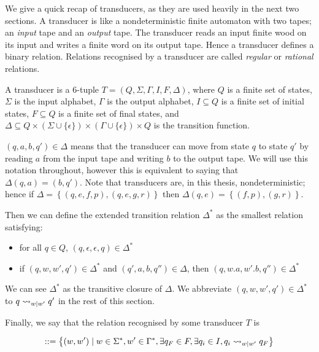 \documentclass[10pt, a4paper]{report}
\begin{document}
We give a quick recap of transducers, as they are used heavily in the next two
sections. A transducer is like a nondeterministic finite automaton with two
tapes; an \emph{input} tape and an \emph{output} tape. The transducer reads
an input finite wood on its input and writes a finite word on its output tape.
Hence a transducer defines a binary relation. Relations recognised by a
transducer are called \emph{regular} or \emph{rational} relations. 

A transducer is a 6-tuple $T = (Q, \Sigma, \Gamma, I, F, \Delta)$, where $Q$ is
a finite set of states, $\Sigma$ is the input alphabet, $\Gamma$ is the output
alphabet, $I \subseteq Q$ is a finite set of initial states, $F \subseteq Q$ is
a finite set of final states, and $\Delta \subseteq Q \times \left( \Sigma \cup
  \{\epsilon\} \right) \times \left( \Gamma \cup \{\epsilon\} \right) \times Q$
is the transition function.

$(q, a, b, q') \in \Delta$ means that the transducer can move from state $q$ to
state $q'$ by reading $a$ from the input tape and writing $b$ to the output
tape. We will use this notation throughout, however this is equivalent to saying
that $\Delta(q, a) = (b, q')$. Note that transducers are, in this thesis,
nondeterministic; hence if $\Delta = \left\{ (q, e, f, p), (q, e, g, r)
\right\}$ then $\Delta(q, e) = \left\{ (f, p), (g, r) \right\}$.

Then we can define the extended transition relation $\Delta^\ast$ as the
smallest relation satisfying:

\begin{itemize}
\item for all $q \in Q$, $(q, \epsilon, \epsilon, q) \in \Delta^\ast$
\item if $(q, w, w', q') \in \Delta^\ast$ and $(q', a, b, q'') \in \Delta$, then
  $(q, w . a, w' . b, q'') \in \Delta^\ast$
  
\end{itemize}

We can see $\Delta^\ast$ as the transitive closure of $\Delta$. We abbreviate
$(q, w, w', q') \in \Delta^\ast$ to $q \rightsquigarrow_{w \mid w'} q'$ in the rest of
this section.

Finally, we say that the relation recognised by some transducer $T$ is

\begin{align*}
  [T] ::= \left\{ (w, w') \mid w \in \Sigma^\ast, w' \in \Gamma^\ast, \exists q_F \in F, \exists q_i \in I, q_i \rsarrow_{w \mid w'} q_F \right\}
\end{align*}
\end{document}
